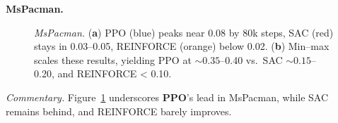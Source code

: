 \noindent \textbf{MsPacman.}
\begin{figure} 
	\centering
	\quad
	\caption{\emph{MsPacman.}
		(\textbf{a}) PPO (blue) peaks near 0.08 by 80k steps, SAC (red) stays in 0.03--0.05, REINFORCE (orange) below 0.02.
		(\textbf{b}) Min--max scales these results, yielding PPO at \(\sim0.35\)--0.40 vs.\ SAC \(\sim0.15\)--0.20, and REINFORCE < 0.10.}
	\label{fig:mspacman_combined}
\end{figure}

\noindent
\emph{Commentary.} Figure~\ref{fig:mspacman_combined} underscores \textbf{PPO}’s lead in MsPacman, while SAC remains behind, and REINFORCE barely improves.

\medskip

